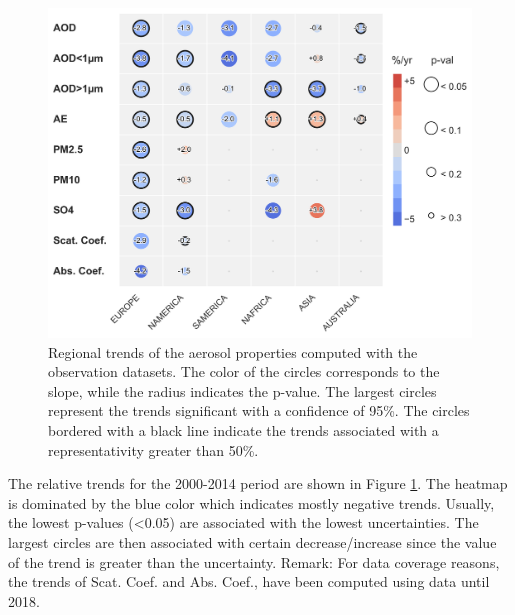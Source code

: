 \documentclass[journal abbreviation, manuscript]{copernicus}
\begin{document}
\begin{figure}[t]
 \includegraphics[width=12cm]{../scripts/figs/heatmaps/OBS.png}
 \caption{Regional trends of the aerosol properties computed with the observation datasets. The color of the circles corresponds to the slope, while the radius indicates the p-value. The largest circles represent the trends significant with a confidence of 95\%. The circles bordered with a black line indicate the trends associated with a representativity greater than 50\%.}
 \label{fig:obs_trends}
\end{figure}

The relative trends for the 2000-2014 period are shown in Figure \ref{fig:obs_trends}. The heatmap is dominated by the blue color which indicates mostly negative trends. Usually, the lowest p-values (<0.05) are associated with the lowest uncertainties. The largest circles are then associated with certain decrease/increase since the value of the trend is greater than the uncertainty. Remark: For data coverage reasons, the trends of Scat. Coef. and Abs. Coef., have been computed using data until 2018.
\end{document}
